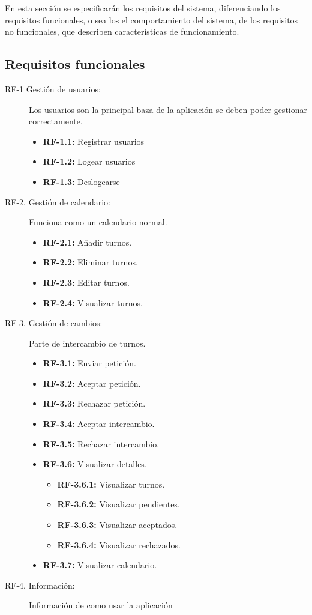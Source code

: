 En esta sección se especificarán los requisitos del sistema, diferenciando los requisitos funcionales, o sea los  el comportamiento del sistema, de los requisitos no funcionales, que describen características de funcionamiento.
\subsection{Requisitos funcionales}\label{r-funcionales}
\begin{description}
    \item[RF-1 Gestión de usuarios:] Los usuarios son la principal baza de la aplicación se deben poder gestionar correctamente.
    \begin{itemize}
         \item \textbf{RF-1.1:} Registrar usuarios
         \item \textbf{RF-1.2:} Logear usuarios
         \item \textbf{RF-1.3:} Deslogearse
    \end{itemize}
   \item[RF-2. Gestión de calendario:] Funciona como un calendario normal.
    \begin{itemize}
         \item \textbf{RF-2.1:} Añadir turnos.
         \item \textbf{RF-2.2:} Eliminar turnos.
         \item \textbf{RF-2.3:} Editar turnos.
         \item \textbf{RF-2.4:} Visualizar turnos.
    \end{itemize}
 	   \item[RF-3. Gestión de cambios:] Parte de intercambio de turnos.
    \begin{itemize}
         \item \textbf{RF-3.1:} Enviar petición.
         \item \textbf{RF-3.2:} Aceptar petición.
         \item \textbf{RF-3.3:} Rechazar petición. 
         \item \textbf{RF-3.4:} Aceptar intercambio.
         \item \textbf{RF-3.5:} Rechazar intercambio.
         \item \textbf{RF-3.6:} Visualizar detalles.
           \begin{itemize}
             \item \textbf{RF-3.6.1:} Visualizar turnos.
             \item \textbf{RF-3.6.2:} Visualizar pendientes.
             \item \textbf{RF-3.6.3:} Visualizar aceptados.
             \item \textbf{RF-3.6.4:} Visualizar rechazados.
           \end{itemize}
         \item \textbf{RF-3.7:} Visualizar calendario.
    \end{itemize}
       
    
    
   \item[RF-4. Información:] Información de como usar la aplicación
\end{description}

